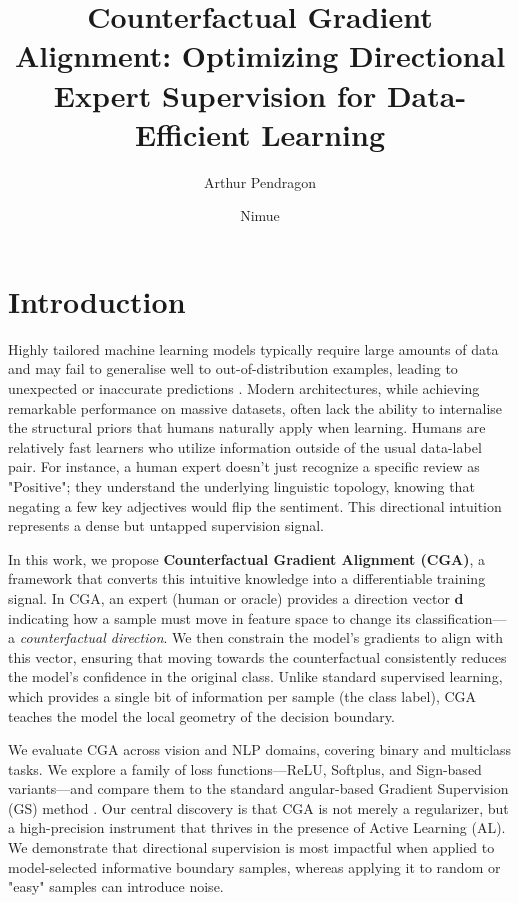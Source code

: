 \documentclass[sigconf,anonymous]{aamas}
\title[Counterfactual Gradient Alignment]{Counterfactual Gradient Alignment: Optimizing Directional Expert Supervision for Data-Efficient Learning}
\author{Arthur Pendragon}
\affiliation{
  \institution{Camelot Castle}
  \city{Camelot}
  \country{United Kingdom}}
\author{Nimue}
\affiliation{
  \institution{The Lady's Lake}
  \city{Avalon}
  \country{United Kingdom}}
\begin{document}

\pagestyle{fancy}
\fancyhead{}


\maketitle 


\section{Introduction}
Highly tailored machine learning models typically require large amounts of data and may fail to generalise well to out-of-distribution examples, leading to unexpected or inaccurate predictions \cite{hand_classifier, Challen231, souza2020challenges}. Modern architectures, while achieving remarkable performance on massive datasets, often lack the ability to internalise the structural priors that humans naturally apply when learning. Humans are relatively fast learners who utilize information outside of the usual data-label pair. For instance, a human expert doesn't just recognize a specific review as "Positive"; they understand the underlying linguistic topology, knowing that negating a few key adjectives would flip the sentiment. This directional intuition represents a dense but untapped supervision signal.

In this work, we propose \textbf{Counterfactual Gradient Alignment (CGA)}, a framework that converts this intuitive knowledge into a differentiable training signal. In CGA, an expert (human or oracle) provides a direction vector $\mathbf{d}$ indicating how a sample must move in feature space to change its classification---a \emph{counterfactual direction}. We then constrain the model's gradients to align with this vector, ensuring that moving towards the counterfactual consistently reduces the model's confidence in the original class. Unlike standard supervised learning, which provides a single bit of information per sample (the class label), CGA teaches the model the local geometry of the decision boundary.

We evaluate CGA across vision and NLP domains, covering binary and multiclass tasks. We explore a family of loss functions---ReLU, Softplus, and Sign-based variants---and compare them to the standard angular-based Gradient Supervision (GS) method \cite{teney2020learning}. Our central discovery is that CGA is not merely a regularizer, but a high-precision instrument that thrives in the presence of Active Learning (AL). We demonstrate that directional supervision is most impactful when applied to model-selected informative boundary samples, whereas applying it to random or "easy" samples can introduce noise.
\end{document}
